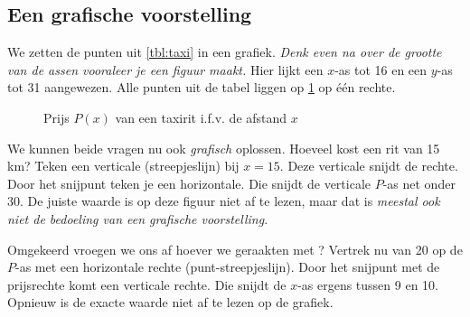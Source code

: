 \subsection{Een grafische voorstelling}
\label{subsec:grafischeVoorstelling}
We zetten de punten uit \cref{tbl:taxi} in een grafiek.
\emph{Denk even na over de grootte van de assen vooraleer je een figuur maakt.}
Hier lijkt een $x$-as tot 16 en een $y$-as tot 31 aangewezen. Alle punten uit de tabel liggen op \cref{fig:taxir} op \'e\'en rechte.
\begin{figure}[htbp]
    \centering
{}
\caption{Prijs $P(x)$ van een taxirit i.f.v. de afstand $x$}
    \label{fig:taxir}
\end{figure}

We kunnen beide vragen nu ook \emph{grafisch} oplossen. Hoeveel kost een rit van 15 km? Teken een verticale (streepjeslijn) bij $x=15$. Deze verticale snijdt de rechte. Door het snijpunt teken je een horizontale. Die snijdt de verticale $P$-as net onder 30. De juiste waarde is op deze figuur niet af te lezen, maar dat is \emph{meestal ook niet de bedoeling van een grafische voorstelling}.

Omgekeerd vroegen we ons af hoever we geraakten met ? Vertrek nu van 20 op de $P$-as met een horizontale rechte (punt-streepjeslijn). Door het snijpunt met de prijsrechte komt een verticale rechte. Die snijdt de $x$-as ergens tussen 9 en 10. Opnieuw is de exacte waarde niet af te lezen op de grafiek.



